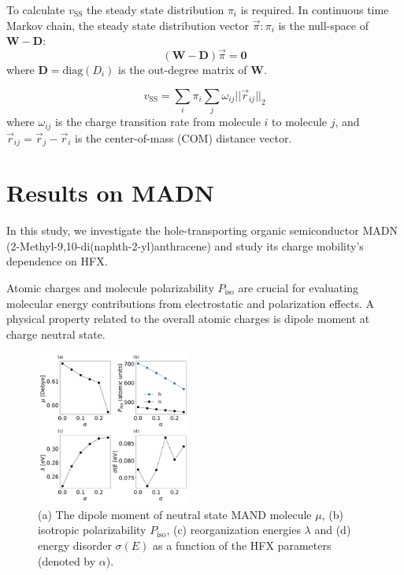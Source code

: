 \documentclass[%
 reprint,
 amsmath,amssymb,
 aps,
]{revtex4-2}
\begin{document}
To calculate $v_\text{SS}$ the steady state distribution $\pi_i$ is required. In continuous time Markov chain, the steady state distribution vector $\vec{\pi}: \pi_i$ is the null-space of $\mathbf{W}-\mathbf{D}$:
\begin{equation}
    (\mathbf{W}-\mathbf{D} )\vec{\pi} = \mathbf{0}
\end{equation}
where $\mathbf{D} = \text{diag}(D_i)$ is the out-degree matrix of $\mathbf{W}$.

\begin{equation}
    v_\text{SS} = \sum_i \pi_i \sum_j \omega_{ij} || \vec{r}_{ij}||_2
\end{equation} 
where $\omega_{ij}$ is the charge transition rate from molecule $i$ to molecule $j$, and $\vec{r}_{ij}=\vec{r}_j - \vec{r}_i$ is the center-of-mass (COM) distance vector. 

\section{Results on MADN}

In this study, we investigate the hole-transporting organic semiconductor MADN (2-Methyl-9,10-di(naphth-2-yl)anthracene) and study its charge mobility's dependence on HFX. 

Atomic charges and molecule polarizability $P_\text{iso}$ are crucial for evaluating molecular energy contributions from electrostatic and polarization effects. A physical property related to the overall atomic charges is dipole moment at charge neutral state. 


%
\begin{figure}
    \centering
    \includegraphics[width=0.45\textwidth]{figs/fig_autogen.pdf}
    \caption{(a) The dipole moment of neutral state MAND molecule $\mu$, (b) isotropic polarizability $P_\text{iso}$, (c) reorganization energies $\lambda$ and (d) energy disorder $\sigma(E)$ as a function of the HFX parameters (denoted by $\alpha$).}
    \label{fig:autogen_MADN}
\end{figure}
% 
\end{document}
